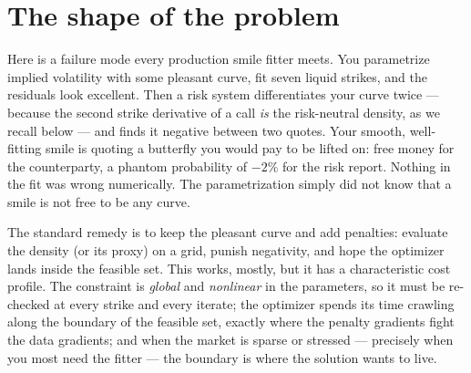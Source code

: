 \documentclass[11pt]{article}
\begin{document}
\begin{abstract}
off the same upper-share ledger that prices the calls.  What the continuous
construction proves, a numerical certificate must inherit: a randomized
strike-space audit bounds the implementation's residual arbitrage below
$10^{-8}$ in normalized price, and a stability study measures --- rather
than asserts --- how far the tail parameters are identified by quotes.
Every figure is
generated by the production calibrator on deterministic synthetic
benchmarks: a ten-parameter fit to an SPX-like strip reaches a maximum error
of \lqdfreshspxmaxerr\ volatility basis points, and a seventeen-parameter fit
recovers an asymmetric bimodal event density to \lqdfresheventmaxerr\ vol
basis points.  Market-fit evidence lives in the backtest reports; what this
lecture establishes is the machine itself.
\end{abstract}

\tableofcontents
\newpage

\section{The shape of the problem}
\label{sec:problem}

Here is a failure mode every production smile fitter meets.  You parametrize
implied volatility with some pleasant curve, fit seven liquid strikes, and the
residuals look excellent.  Then a risk system differentiates your curve twice
--- because the second strike derivative of a call \emph{is} the risk-neutral
density, as we recall below --- and finds it negative between two quotes.
Your smooth, well-fitting smile is quoting a butterfly you would pay to be
lifted on: free money for the counterparty, a phantom probability of
$-2\%$ for the risk report.  Nothing in the fit was wrong numerically.  The
parametrization simply did not know that a smile is not free to be any curve.

The standard remedy is to keep the pleasant curve and add penalties: evaluate
the density (or its proxy) on a grid, punish negativity, and hope the
optimizer lands inside the feasible set.  This works, mostly, but it has a
characteristic cost profile.  The constraint is \emph{global} and
\emph{nonlinear} in the parameters, so it must be re-checked at every strike
and every iterate; the optimizer spends its time crawling along the boundary
of the feasible set, exactly where the penalty gradients fight the data
gradients; and when the market is sparse or stressed --- precisely when you
most need the fitter --- the boundary is where the solution wants to live.
\end{document}
